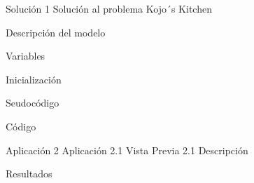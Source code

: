 \documentclass[]{article}
\begin{document}
\begin{section} {Soluci\'{o}n}
1  Solución al problema Kojo´s Kitchen

\begin{subsection} {Descripci\'{o}n del modelo}
\end{subsection}

\begin{subsection} {Variables}
\end{subsection}

\begin{subsection} {Inicialización }
\end{subsection}

\begin{subsection} {Seudocódigo}
\end{subsection}

\begin{subsection} {C\'{o}digo}

\begin{center}

\end{center}

\end{subsection}

\end{section}


\begin{section} {Aplicaci\'{o}n}
2 Aplicación
2.1 Vista Previa
2.1 Descripción
\end{section}

\begin{section} {Resultados}
\end{section}	
\end{document}
